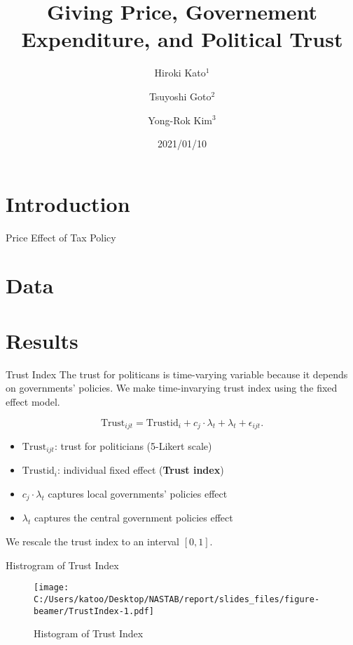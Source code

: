 \documentclass[
  ignorenonframetext,
]{beamer}
\title{Giving Price, Governement Expenditure, and Political Trust}
\author{Hiroki Kato\(^1\) \and Tsuyoshi Goto\(^2\) \and Yong-Rok
Kim\(^3\)}
\date{2021/01/10}
\institute{\(^1\)Osaka University \and \(^2\)Chiba
University \and \(^3\)Kobe University}
\providecommand{\tightlist}{%
  \setlength{\itemsep}{0pt}\setlength{\parskip}{0pt}}
\begin{document}
\frame{\titlepage}

\hypertarget{introduction}{%
\section{Introduction}\label{introduction}}

\begin{frame}{Price Effect of Tax Policy}
\protect\hypertarget{price-effect-of-tax-policy}{}
\end{frame}

\hypertarget{data}{%
\section{Data}\label{data}}

\hypertarget{results}{%
\section{Results}\label{results}}

\begin{frame}{Trust Index}
\protect\hypertarget{trust-index}{}
The trust for politicans is time-varying variable because it depends on
governments' policies. We make time-invarying trust index using the
fixed effect model.

\[
    \text{Trust}_{ijt} = \text{Trustid}_i + c_j \cdot \lambda_t + \lambda_t + \epsilon_{ijt}.
\]

\begin{itemize}
\tightlist
\item
  \(\text{Trust}_{ijt}\): trust for politicians (5-Likert scale)
\item
  \(\text{Trustid}_i\): individual fixed effect (\textbf{Trust index})
\item
  \(c_j \cdot \lambda_t\) captures local governments' policies effect
\item
  \(\lambda_t\) captures the central government policies effect
\end{itemize}

We rescale the trust index to an interval \([0,1]\).
\end{frame}

\begin{frame}{Histrogram of Trust Index}
\protect\hypertarget{histrogram-of-trust-index}{}
\begin{figure}
\centering
\texttt{[image: C:/Users/katoo/Desktop/NASTAB/report/slides\_files/figure-beamer/TrustIndex-1.pdf]}
\caption{Histogram of Trust Index}
\end{figure}
\end{frame}
\end{document}
